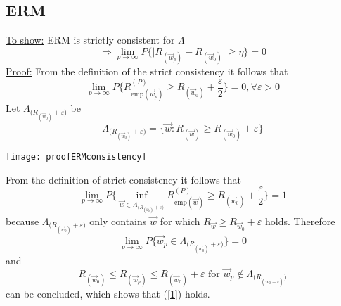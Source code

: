 \subsection{ERM}
\underline{To show:} ERM is strictly consistent for $\Lambda$ 
\begin{equation} \label{1}
	\Rightarrow \lim_{p \rightarrow \infty}  
		P\Big\{ \Big| R_{(\vec{w}_p)} - 
			R_{(\vec{w}_0)} \Big|
			\geq \eta
		\Big\} = 0
\end{equation}
\underline{Proof:} From the definition of the strict consistency it follows that
\begin{equation} 
	\lim_{p \rightarrow \infty}  
		P\Big\{ R_{\mathrm{emp} (\vec{w}_p)}^{(P)}
			\geq R_{(\vec{w}_0)} + 
			\frac{\varepsilon}{2}
		\Big\} = 0, \forall \varepsilon > 0
\end{equation}
Let $\Lambda_{ \big(R_{(\vec{w}_0)} + \varepsilon\big) }$ be
\begin{equation}
	\Lambda_{ \big(R_{(\vec{w}_0)} + \varepsilon\big) }
	= \Big\{ \vec{w}: R_{(\vec{w})} 
	\geq R_{(\vec{w}_0)} + \varepsilon \Big\}
\end{equation}
\begin{center}
	\texttt{[image: proofERMconsistency]}
\end{center}
From the definition of strict consistency it follows that
\begin{equation}
	\lim_{p \rightarrow \infty}  
		P\Bigg\{ \inf_{\vec{w} \in 
			 \Lambda_{ \big(R_{ (\vec{w}_0) }  
				+ \varepsilon\big) } } 
			R_{\mathrm{emp} (\vec{w})}^{(P)}
			\geq R_{(\vec{w}_0 )} 
				+ \frac{\varepsilon}{2}
		\Bigg\} = 1
\end{equation}
because $\Lambda_{ \big(R_{(\vec{w}_0)} + \varepsilon\big) }$ only contains $\vec{w}$ for which $R_{ \vec{w} } \geq R_{ \vec{w}_0} + \varepsilon$ holds.
Therefore 
\begin{equation}
	\lim_{p \rightarrow \infty}  
		P\bigg\{ \vec{w}_p \in 
			\Lambda_{ \big(R_{(\vec{w}_0) } 
				+ \varepsilon \big) }
		\bigg\} = 0
\end{equation}
and
\begin{equation}
	R_{ (\vec{w}_0 )} \leq R_{ (\vec{w}_p )}
	\leq R_{ (\vec{w}_0 ) } + \varepsilon 
	\text{ for } \vec{w}_p 
		\notin  \Lambda_{ \big(R_{(\vec{w}_0 
				+ \varepsilon)} \big) }
\end{equation}
can be concluded, which shows that (\ref{1}) holds.
